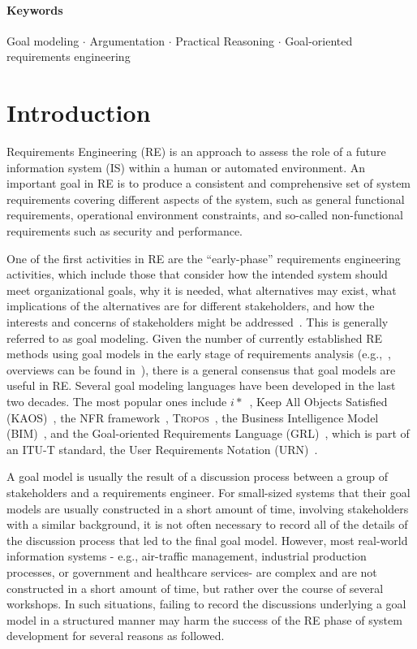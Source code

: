 \documentclass[11.5pt,two column]{llncs}
\begin{document}
\newpage

\paragraph{Keywords} Goal modeling $\cdot$ Argumentation $\cdot$ Practical Reasoning $\cdot$ Goal-oriented requirements engineering

\section{Introduction}
\label{sect:introduction}
Requirements Engineering (RE) is an approach to assess the role of a future information system (IS) within a human or automated environment. An important goal in RE is to produce a consistent and comprehensive set of system requirements covering different aspects of the system, such as general functional requirements, operational environment constraints, and so-called non-functional requirements such as security and performance. 

One of the first activities in RE are the ``early-phase'' requirements engineering activities, which include those that consider how the intended system should meet organizational goals, why it is needed, what alternatives may exist, what implications of the alternatives are for different stakeholders, and how the interests and concerns of stakeholders might be addressed~\cite{yu1997towards}. This is generally referred to as goal modeling. Given the number of currently established RE methods using goal models in the early stage of requirements analysis (e.g.,~\cite{liu2004designing,donzelli2004goal,dardenne1993goal,chung2012non,castro2002towards}, overviews can be found in~\cite{van2001goal,kavakliL05}), there is a general consensus that goal models are useful in RE. Several goal modeling languages have been developed in the last two decades. The most popular ones include $i*$~\cite{Yu:1997:TMR:827255.827807}, Keep All Objects Satisfied (KAOS)~\cite{van2008requirements}, the NFR framework~\cite{chung2012non}, \textsc{Tropos}~\cite{giorgini2005goal}, the Business Intelligence Model (BIM)~\cite{horkoff2014strategic}, and the Goal-oriented Requirements Language (GRL)~\cite{Amyot:2010:EGM:1841349.1841356}, which is part of an ITU-T standard, the User Requirements Notation (URN)~\cite{URN}.

A goal model is usually the result of a discussion process between a group of stakeholders and a requirements engineer. For small-sized systems that their goal models are usually constructed in a short amount of time, involving stakeholders with a similar background, it is not often necessary to record all of the details of the discussion process that led to the final goal model. %
However, most real-world information systems \-- e.g., air-traffic management, industrial production processes, or government and healthcare services\-- are complex and are not constructed in a short amount of time, but rather over the course of several workshops. In such situations, failing to record the discussions underlying a goal model in a structured manner may harm the success of the RE phase of system development for several reasons as followed. 
\end{document}
